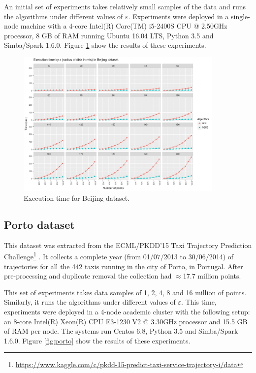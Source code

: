 \documentclass[12pt]{scrartcl}
\begin{document}
An initial set of experiments takes relatively small samples of the data and runs the algorithms under different values of $\varepsilon$. Experiments were deployed in a single-node machine with a 4-core Intel(R) Core(TM) i5-2400S CPU @ 2.50GHz processor, 8 GB of RAM running Ubuntu 16.04 LTS, Python 3.5 and Simba/Spark 1.6.0.  Figure \ref{fig:beijing} show the results of these experiments.

\begin{figure}
 \centering
 \includegraphics[width=0.9\textwidth]{figures/beijing} 
 \caption{Execution time for Beijing dataset.}
 \label{fig:beijing}
\end{figure}

\subsection{Porto dataset}
This dataset was extracted from the ECML/PKDD'15 Taxi Trajectory Prediction Challenge\footnote{\url{https://www.kaggle.com/c/pkdd-15-predict-taxi-service-trajectory-i/data}} \citep{lam_blue_2015, moreira-matias_predicting_2013}.  It collects a complete year (from 01/07/2013 to 30/06/2014) of trajectories for all the 442 taxis running in the city of Porto, in Portugal. After pre-processing and duplicate removal the collection had $\approx$17.7 million points.

This set of experiments takes data samples of 1, 2, 4, 8 and 16 million of points.  Similarly, it runs the algorithms under different values of $\varepsilon$.  This time, experiments were deployed in a 4-node academic cluster with the following setup: an 8-core Intel(R) Xeon(R) CPU E3-1230 V2 @ 3.30GHz processor and 15.5 GB of RAM per node.  The systems run Centos 6.8, Python 3.5 and Simba/Spark 1.6.0.  Figure \ref{fig:porto} show the results of these experiments.
\end{document}
